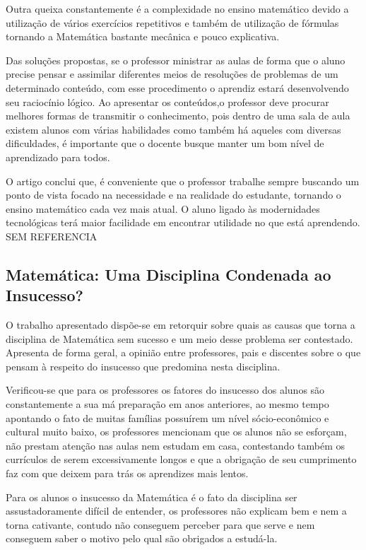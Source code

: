 \documentclass[12pt,a4paper]{article}
\begin{document}
Outra queixa constantemente é a complexidade no ensino matemático devido a utilização de vários exercícios repetitivos e também de utilização de fórmulas tornando a Matemática bastante mecânica e pouco explicativa. 

Das soluções propostas, se o professor ministrar as aulas de forma que o aluno precise pensar e assimilar diferentes meios de resoluções de problemas de um determinado conteúdo, com esse procedimento o aprendiz estará desenvolvendo seu raciocínio lógico.  
Ao apresentar os conteúdos,o professor deve procurar melhores formas de transmitir o conhecimento, pois dentro de uma sala de aula existem alunos com várias habilidades como também há aqueles com diversas dificuldades, é importante que o docente busque manter um bom nível de aprendizado para todos.

O artigo conclui que, é conveniente que o professor trabalhe sempre buscando um ponto de vista focado na necessidade e na realidade do estudante, tornando o ensino matemático cada vez mais atual. O aluno ligado às modernidades tecnológicas terá maior facilidade em encontrar utilidade no que está aprendendo. SEM REFERENCIA

\subsection{Matemática: Uma Disciplina Condenada ao Insucesso?}

O trabalho apresentado dispõe-se em retorquir sobre quais as causas que torna a disciplina de Matemática sem sucesso e um meio desse problema ser contestado. Apresenta de forma geral, a opinião entre professores, pais e discentes sobre o que pensam à respeito do insucesso que predomina nesta disciplina.

Verificou-se que para os professores os fatores do insucesso dos alunos são constantemente a sua má preparação em anos anteriores, ao mesmo tempo apontando o fato de muitas famílias possuírem um nível sócio-econômico e cultural muito baixo, os professores mencionam que os alunos não se esforçam, não prestam atenção nas aulas nem estudam em casa, contestando também os currículos de serem excessivamente longos e que a obrigação de seu cumprimento faz com que deixem para trás os aprendizes  mais lentos. 

Para os alunos o insucesso da Matemática é o fato da disciplina ser assustadoramente difícil de entender, os professores não explicam bem e nem a torna cativante, contudo não conseguem perceber para que serve e nem conseguem saber o motivo pelo qual são obrigados a estudá-la.
\end{document}
